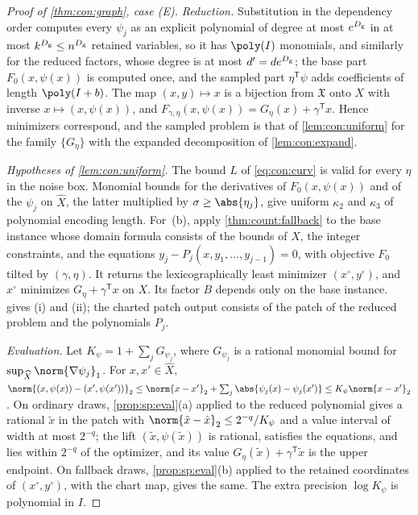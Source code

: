 \begin{proof}[Proof of \cref{thm:con:graph}, case (E)]
\emph{Reduction.} Substitution in the dependency order computes every
$\psi_j$ as an explicit polynomial of degree at most $e^{D_{\rm g}}$ in at
most $k^{D_{\rm g}}\le n^{D_{\rm g}}$ retained variables, so it has
$\poly(I)$ monomials, and similarly for the reduced factors, whose degree is
at most $d'=de^{D_{\rm g}}$; the base part $F_0(x,\psi(x))$ is computed once,
and the sampled part $\eta^{\mathsf T}\psi$ adds coefficients of length
$\poly(I+b)$. The map $(x,y)\mapsto x$ is a bijection from $\mathfrak X$ onto
$X$ with inverse $x\mapsto(x,\psi(x))$, and
$F_{\gamma,\eta}(x,\psi(x))=G_\eta(x)+\gamma^{\mathsf T}x$. Hence minimizers
correspond, and the sampled problem is that of \cref{lem:con:uniform} for the
family $\{G_\eta\}$ with the expanded decomposition of \cref{lem:con:expand}.

\emph{Hypotheses of \cref{lem:con:uniform}.} The bound $L$ of
\eqref{eq:con:curv} is valid for every $\eta$ in the noise box. Monomial
bounds for the derivatives of $F_0(x,\psi(x))$ and of the $\psi_j$ on
$\widehat X$, the latter multiplied by $\sigma\ge\abs{\eta_j}$, give uniform
$\kappa_2$ and $\kappa_3$ of polynomial encoding length. For~(b), apply
\cref{thm:count:fallback} to the base instance whose domain formula consists
of the bounds of $X$, the integer constraints, and the equations
$y_j-P_j(x,y_1,\dots,y_{j-1})=0$, with objective $F_0$ tilted by
$(\gamma,\eta)$. It returns the lexicographically least minimizer
$(x^\circ,y^\circ)$, and $x^\circ$ minimizes $G_\eta+\gamma^{\mathsf T}x$ on
$X$. Its factor $B$ depends only on the base instance. 
gives (i) and (ii); the charted patch output consists of the patch of the
reduced problem and the polynomials $P_j$.

\emph{Evaluation.} Let $K_\psi=1+\sum_jG_{\psi_j}$, where $G_{\psi_j}$ is a
rational monomial bound for $\sup_{\widehat X}\norm{\nabla\psi_j}_1$. For
$x,x'\in\widehat X$,
$\norm{(x,\psi(x))-(x',\psi(x'))}_2\le\norm{x-x'}_2+\sum_j\abs{\psi_j(x)-\psi_j(x')}
\le K_\psi\norm{x-x'}_2$. On ordinary draws, \cref{prop:sp:eval}(a) applied
to the reduced polynomial gives a rational $\tilde x$ in the patch with
$\norm{\tilde x-\hat x}_2\le2^{-q}/K_\psi$ and a value interval of width at
most $2^{-q}$; the lift $(\tilde x,\psi(\tilde x))$ is rational, satisfies the
equations, and lies within $2^{-q}$ of the optimizer, and its value
$G_\eta(\tilde x)+\gamma^{\mathsf T}\tilde x$ is the upper endpoint. On
fallback draws, \cref{prop:sp:eval}(b) applied to the retained coordinates of
$(x^\circ,y^\circ)$, with the chart map, gives the same. The extra precision
$\log K_\psi$ is polynomial in $I$.
\end{proof}

